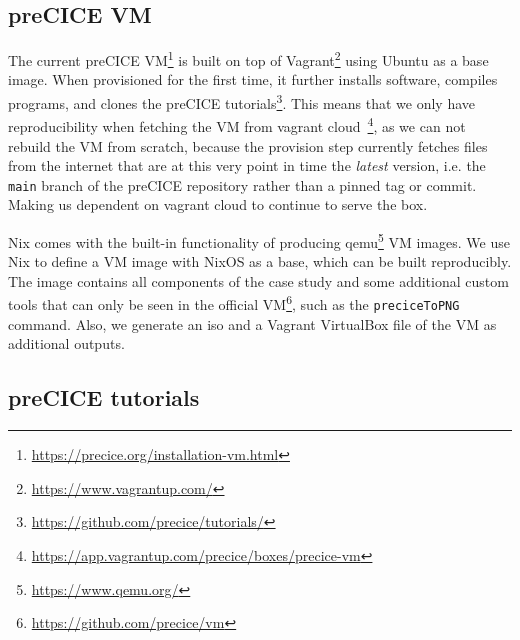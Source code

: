 \documentclass{eceasst}
\begin{document}
\subsection{preCICE VM}

The current preCICE VM\footnote{\url{https://precice.org/installation-vm.html}} is built on top of Vagrant\footnote{\url{https://www.vagrantup.com/}} using Ubuntu as a base image.
When provisioned for the first time, it further installs software, compiles programs, and clones the preCICE tutorials\footnote{\url{https://github.com/precice/tutorials/}}.
This means that we only have reproducibility when fetching the VM from vagrant cloud~\footnote{\url{https://app.vagrantup.com/precice/boxes/precice-vm}}, as we can not rebuild the VM from scratch, because the provision step currently fetches files from the internet that are at this very point in time the \textit{latest} version, i.e. the \texttt{main} branch of the preCICE repository rather than a pinned tag or commit.
Making us dependent on vagrant cloud to continue to serve the box.

Nix comes with the built-in functionality of producing qemu\footnote{\url{https://www.qemu.org/}} VM images.
We use Nix to define a VM image with NixOS as a base, which can be built reproducibly.
The image contains all components of the case study and some additional custom tools that can only be seen in the official VM\footnote{\url{https://github.com/precice/vm}}, such as the \texttt{preciceToPNG} command.
Also, we generate an iso and a Vagrant VirtualBox file of the VM as additional outputs.

\subsection{preCICE tutorials}
\end{document}
